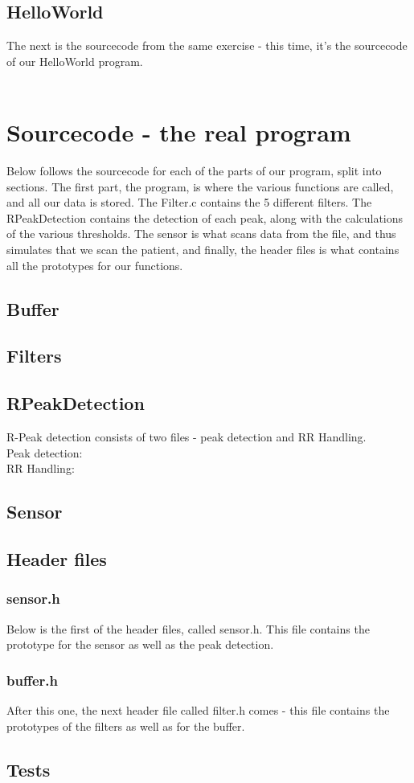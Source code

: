 \documentclass[12pt,a4paper]{article}
\begin{document}
\subsection{HelloWorld}
	The next is the sourcecode from the same exercise - this time, it's the sourcecode of our HelloWorld program.\\
	\\
	
	
\section{Sourcecode - the real program}
	Below follows the sourcecode for each of the parts of our program, split into sections. The first part, the program, is where the various functions are called, and all our data is stored. The Filter.c contains the 5 different filters. The RPeakDetection contains the detection of each peak, along with the calculations of the various thresholds. The sensor is what scans data from the file, and thus simulates that we scan the patient, and finally, the header files is what contains all the prototypes for our functions.
\subsection{Buffer}
		
\subsection{Filters}
	
\subsection{RPeakDetection}
	R-Peak detection consists of two files - peak detection and RR Handling.\\
	Peak detection:\\
		
	RR Handling:\\
		
\subsection{Sensor}
		
\subsection{Header files}
\subsubsection{sensor.h}
	Below is the first of the header files, called sensor.h. This file contains the prototype for the sensor as well as the peak detection.\\
	
\subsubsection{buffer.h}
	After this one, the next header file called filter.h comes - this file contains the prototypes of the filters as well as for the buffer.\\
	
\subsection{Tests}
	\label{Tests}
	
\end{document}
